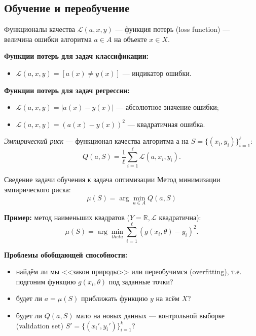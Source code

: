 \documentclass{beamer}
\begin{document}
\subsection{Обучение и переобучение}
\begin{frame}{Функционалы качества}
$\mathscr{L}(a, x, y)$ --- функция потерь (loss function) --- величина ошибки алгоритма $a \in A$ на объекте $x \in X$.

{\bf Функции потерь для задач классификации:}
\begin{itemize}
    \item $\mathscr{L}(a, x, y) = [a(x) \ne y(x)]$ --- индикатор ошибки.
\end{itemize}

{\bf Функции потерь для задач регрессии:}
\begin{itemize}
    \item $\mathscr{L}(a, x, y) = |a(x) - y(x)|$ --- абсолютное значение ошибки;
    \item $\mathscr{L}(a, x, y) = \left(a(x) - y(x)\right)^2$ --- квадратичная ошибка.
\end{itemize}

{\it Эмпирический риск} --- функционал качества алгоритма $а$ на $S = \{(x_i, y_i)\}_{i=1}^{\ell}$:
$$
Q(a, S) = \frac{1}{\ell}\sum\limits_{i = 1}^{\ell}\mathscr{L}(a, x_i, y_i).
$$
\end{frame}

\begin{frame}{Сведение задачи обучения к задача оптимизации}
Метод минимизации эмпирического риска:
$$
\mu(S) = \arg\min_{a \in A} Q(a, S)
$$

{\bf Пример:} метод наименьших квадратов ($Y = \mathbb{R}, \mathscr{L}$ квадратична):
$$
\mu(S) = \arg\min_{theta}\sum\limits_{i=1}^{\ell}\left(g(x_i, \theta) - y_i\right)^2.
$$

{\bf Проблемы обобщающей способности:}
\begin{itemize}
    \item найдём ли мы <<закон природы>> или переобучимся (overfitting), т.е. подгоним функцию $g(x_i,\theta)$ под заданные точки?
    \item будет ли $a = \mu(S)$ приближать функцию $y$ на всём $X$?
    \item будет ли $Q(a, S)$ мало на новых данных --- контрольной выборке (validation set) $S' = \{(x_i', y_i')\}_{i=1}^{k}$?
\end{itemize}
\end{frame}
\end{document}
